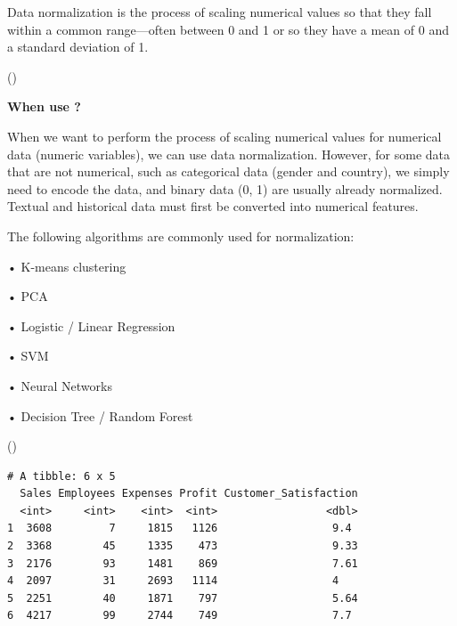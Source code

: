 \documentclass[
  man,
  floatsintext,
  longtable,
  nolmodern,
  notxfonts,
  notimes,
  colorlinks=true,linkcolor=blue,citecolor=blue,urlcolor=blue]{apa7}
\begin{document}
Data normalization is the process of scaling numerical values so that
they fall within a common range---often between 0 and 1 or so they have
a mean of 0 and a standard deviation of 1.

()

\textbf{When use ?}

When we want to perform the process of scaling numerical values for
numerical data (numeric variables), we can use data normalization.
However, for some data that are not numerical, such as categorical data
(gender and country), we simply need to encode the data, and binary data
(0, 1) are usually already normalized. Textual and historical data must
first be converted into numerical features.

The following algorithms are commonly used for normalization:

• K-means clustering

• PCA

• Logistic / Linear Regression

• SVM

• Neural Networks

• Decision Tree / Random Forest

()

\begin{verbatim}
# A tibble: 6 x 5
  Sales Employees Expenses Profit Customer_Satisfaction
  <int>     <int>    <int>  <int>                 <dbl>
1  3608         7     1815   1126                  9.4 
2  3368        45     1335    473                  9.33
3  2176        93     1481    869                  7.61
4  2097        31     2693   1114                  4   
5  2251        40     1871    797                  5.64
6  4217        99     2744    749                  7.7 
\end{verbatim}
\end{document}
